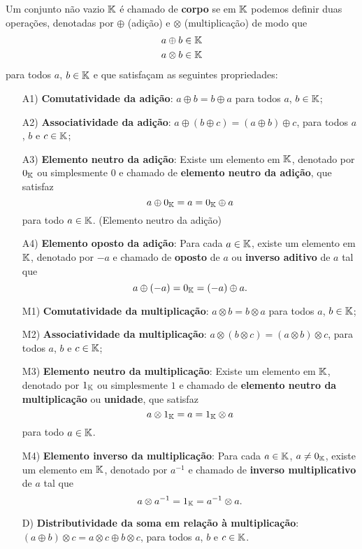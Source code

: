 \begin{definicao}
Um conjunto n\~ao vazio $\mathbb{K}$ \'e chamado de \textbf{corpo} se em $\mathbb{K}$ podemos definir duas opera\c{c}\~oes, denotadas por
$\oplus$ (adi\c{c}\~ao) e $\otimes$ (multiplica\c{c}\~ao) de modo que
\begin{align*}
a \oplus b \in \mathbb{K}\\
a \otimes b \in \mathbb{K}
\end{align*}
para todos $a$, $b \in \mathbb{K}$ e que satisfa\c{c}am as seguintes propriedades:
\begin{itemize}

	\item[A1)] \textbf{Comutatividade da adi\c{c}\~ao}: $a \oplus b = b \oplus a$ para todos $a$, $b \in \mathbb{K}$;
	\item[A2)] \textbf{Associatividade da adi\c{c}\~ao}: $a \oplus (b \oplus c) = (a \oplus b) \oplus c$, para todos $a$, $b$ e $c \in \mathbb{K}$;
	\item[A3)] \textbf{Elemento neutro da adi\c{c}\~ao}: Existe um elemento em $\mathbb{K}$, denotado por $0_{\mathbb{K}}$ ou simplesmente $0$ e chamado de \textbf{elemento neutro da adi\c{c}\~ao}, que satisfaz
	\[
		a \oplus 0_{\mathbb{K}} = a = 0_{\mathbb{K}} \oplus a
	\]
	para todo $a \in \mathbb{K}$. (Elemento neutro da adi\c{c}\~ao)
	\item[A4)] \textbf{Elemento oposto da adi\c{c}\~ao}: Para cada $a \in \mathbb{K}$, existe um elemento em $\mathbb{K}$, denotado por $-a$ e chamado de \textbf{oposto} de $a$ ou \textbf{inverso aditivo} de $a$ tal que
	\[
		a \oplus (-a) = 0_{\mathbb{K}} = (-a) \oplus a.
	\]
	\item[M1)] \textbf{Comutatividade da multiplica\c{c}\~ao}: $a \otimes b = b \otimes a$ para todos $a$, $b \in \mathbb{K}$;
	\item[M2)] \textbf{Associatividade da multiplica\c{c}\~ao}: $a \otimes (b \otimes c) = (a \otimes b) \otimes c$, para todos $a$, $b$ e $c \in \mathbb{K}$;
	\item[M3)] \textbf{Elemento neutro da multiplica\c{c}\~ao}: Existe um elemento em $\mathbb{K}$, denotado por $1_{\mathbb{K}}$ ou simplesmente $1$ e chamado de \textbf{elemento neutro da multiplica\c{c}\~ao} ou \textbf{unidade}, que satisfaz
	\[
		a \otimes 1_{\mathbb{K}} = a = 1_{\mathbb{K}} \otimes a
	\]
	para todo $a \in \mathbb{K}$.
	\item[M4)] \textbf{Elemento inverso da multiplica\c{c}\~ao}: Para cada $a \in \mathbb{K}$, $a \ne 0_{\mathbb{K}}$, existe um elemento em $\mathbb{K}$, denotado por $a^{-1}$ e chamado de \textbf{inverso multiplicativo} de $a$ 
	tal que
	\[
		a \otimes a^{-1} = 1_{\mathbb{K}} = a^{-1} \otimes a.
	\]
	\item[D)] \textbf{Distributividade da soma em rela\c{c}\~ao \`a multiplica\c{c}\~ao}: $(a \oplus b)\otimes c = a\otimes c \oplus b\otimes c$, para todos $a$, $b$ e $c \in \mathbb{K}$.
\end{itemize}
\end{definicao}

